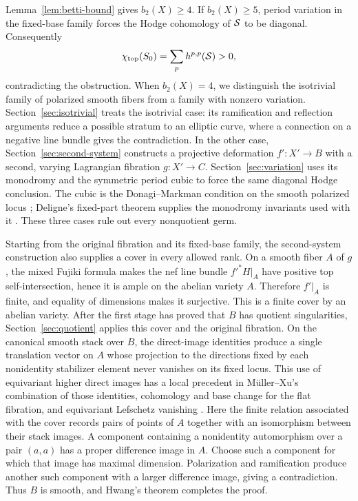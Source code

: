 Lemma~\ref{lem:betti-bound} gives \(b_2(X)\geq4\). If \(b_2(X)\geq5\), period
variation in the fixed-base family forces the Hodge cohomology of \(\mathcal S\)
to be diagonal. Consequently
\[
             \chi_{\mathrm{top}}(S_0)=\sum_p h^{p,p}(\mathcal S)>0,
\]
contradicting the obstruction. When \(b_2(X)=4\), we distinguish the
isotrivial family of polarized smooth fibers from a family with nonzero
variation. Section~\ref{sec:isotrivial} treats the isotrivial case: its
ramification and reflection arguments reduce a possible stratum to an
elliptic curve, where a connection on a negative line bundle gives the
contradiction. In the other case, Section~\ref{sec:second-system} constructs
a projective deformation \(f':X'\to B\) with a second, varying Lagrangian
fibration \(g:X'\to C\). Section~\ref{sec:variation} uses its monodromy and
the symmetric period cubic to force the same diagonal Hodge conclusion.
The cubic is the Donagi--Markman condition on the smooth polarized locus
\cite[Section~7.2, Lemmas~7.1--7.2 and Remark~7.3]{DonagiMarkman1996};
Deligne's fixed-part theorem supplies the monodromy invariants used with it
\cite[Theorem~4.1.1(ii) and Corollary~4.1.2]{Deligne1971}.
These three cases rule out every nonquotient germ.

Starting from the original fibration and its fixed-base family, the
second-system construction also supplies a cover in every allowed rank.
On a smooth fiber \(A\) of \(g\), the mixed Fujiki formula makes the nef
line bundle \(f'^*H|_A\) have positive top self-intersection, hence it is
ample on the abelian variety \(A\). Therefore \(f'|_A\) is finite, and
equality of dimensions makes it surjective. This is a finite cover by an
abelian variety.
After the first stage has proved that \(B\) has quotient singularities,
Section~\ref{sec:quotient} applies this cover and the original fibration.
On the canonical smooth stack over \(B\), the direct-image identities
produce a single translation vector on \(A\) whose projection to the directions
fixed by each nonidentity stabilizer element never vanishes on its fixed locus.
This use of equivariant higher direct images has a local
precedent in Müller--Xu's combination of those identities, cohomology and
base change for the flat fibration, and equivariant Lefschetz vanishing
\cite[Theorem~3.1]{MullerXu2026}. Here the finite relation associated with
the cover records pairs of points of \(A\) together with an isomorphism
between their stack images. A component containing a nonidentity
automorphism over a pair \((a,a)\) has a proper difference image in \(A\).
Choose such a component for which that image has maximal dimension.
Polarization and
ramification produce another such component with a larger difference
image, giving a contradiction. Thus \(B\) is smooth, and Hwang's theorem
completes the proof.

